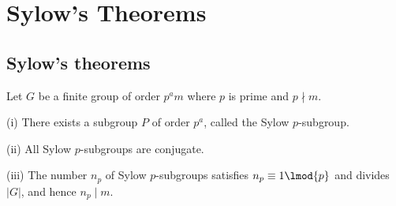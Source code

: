 \section{Sylow's Theorems}%

\subsection{Sylow's theorems}

\begin{theorem}\label{thm:sylow}
Let $G$ be a finite group of order $p^am$ where $p$ is prime and $p \nmid m$.
\ben
\item [(i)] There exists a subgroup $P$ of order $p^a$, called the Sylow $p$-subgroup.
\item [(ii)] All Sylow $p$-subgroups are conjugate.
\item [(iii)] The number $n_p$ of Sylow $p$-subgroups satisfies $n_p \equiv 1 \lmod{p}$ and divides $|G|$, and hence $n_p \mid m$.
\een
\end{theorem}

